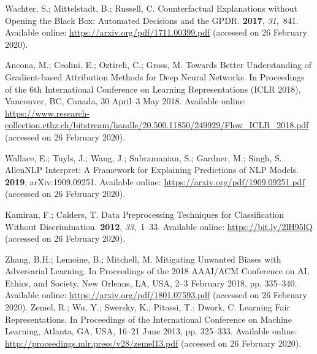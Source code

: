 \documentclass[information,article,accept,moreauthors,pdftex]{Definitions/mdpi}
\begin{document}
{\begin{thebibliography}{999}
Wachter, S.; Mittelstadt, B.; Russell, C.
\newblock Counterfactual {E}xplanations without {O}pening the {B}lack {B}ox:
  {A}utomated {D}ecisions and the {G}{P}{D}{R}.
 {\bf 2017}, {\em 31},~841.
\newblock Available online: \url{https://arxiv.org/pdf/1711.00399.pdf} (accessed on 26 February 2020).

Ancona, M.; Ceolini, E.; Oztireli, C.; Gross, M.
\newblock Towards {B}etter {U}nderstanding of {G}radient-based {A}ttribution
  {M}ethods for {D}eep {N}eural {N}etworks.
\newblock  In Proceedings of the 6th International Conference on Learning Representations (ICLR
  2018), Vancouver, BC, Canada, 30 April--3 May 2018. 
\newblock Available online: 
  \url{https://www.research-collection.ethz.ch/bitstream/handle/20.500.11850/249929/Flow_ICLR_2018.pdf} (accessed on 26 February 2020).

Wallace, E.; Tuyls, J.; Wang, J.; Subramanian, S.; Gardner, M.; Singh, S.
\newblock AllenNLP Interpret: A Framework for Explaining Predictions of NLP
  Models.
 {\bf 2019}, arXiv:1909.09251.
\newblock Available online: \url{https://arxiv.org/pdf/1909.09251.pdf} (accessed on 26 February 2020).

Kamiran, F.; Calders, T.
\newblock Data {P}reprocessing {T}echniques for {C}lassification {W}ithout
  {D}iscrimination.
 {\bf 2012}, {\em 33},~1--33.
\newblock Available online: \url{https://bit.ly/2lH95lQ} (accessed on 26 February 2020).

Zhang, B.H.; Lemoine, B.; Mitchell, M.
\newblock Mitigating {U}nwanted {B}iases with {A}dversarial {L}earning.
\newblock  In Proceedings of the 2018 AAAI/ACM Conference on AI, Ethics, and
  Society, New Orleans, LA, USA, 2--3 February 2018, pp. 335--340.
\newblock Available online: \url{https://arxiv.org/pdf/1801.07593.pdf} (accessed on 26 February 2020).
Zemel, R.; Wu, Y.; Swersky, K.; Pitassi, T.; Dwork, C.
\newblock Learning {F}air {R}epresentations.
\newblock In Proceedings of the  International Conference on Machine Learning, Atlanta, GA, USA, 16--21 June 2013, pp. 325--333. %
\newblock Available online: \url{http://proceedings.mlr.press/v28/zemel13.pdf} (accessed on 26 February 2020).


\end{thebibliography}}
\end{document}
